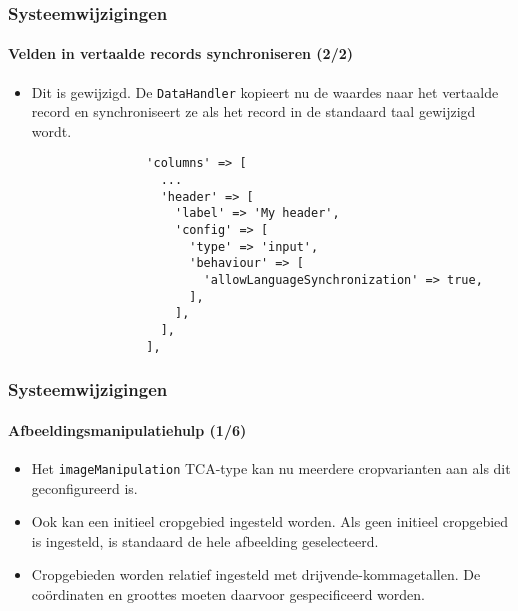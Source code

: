 
\begin{frame}[fragile]
	\frametitle{Systeemwijzigingen}
	\framesubtitle{Velden in vertaalde records synchroniseren (2/2)}

	\lstset{basicstyle=\tiny\ttfamily}

	\begin{itemize}
		\item Dit is gewijzigd. De \texttt{DataHandler} kopieert nu de waardes naar het vertaalde record
		 	en synchroniseert ze als het record in de standaard taal gewijzigd wordt.

			\begin{lstlisting}
				'columns' => [
				  ...
				  'header' => [
				    'label' => 'My header',
				    'config' => [
				      'type' => 'input',
				      'behaviour' => [
				        'allowLanguageSynchronization' => true,
				      ],
				    ],
				  ],
				],
			\end{lstlisting}

	\end{itemize}

\end{frame}


\begin{frame}[fragile]
	\frametitle{Systeemwijzigingen}
	\framesubtitle{Afbeeldingsmanipulatiehulp (1/6)}

	\lstset{basicstyle=\tiny\ttfamily}

	\begin{itemize}
		\item Het \texttt{imageManipulation} TCA-type kan nu meerdere cropvarianten aan als dit geconfigureerd is.

		\item Ook kan een initieel cropgebied ingesteld worden. Als geen initieel cropgebied is ingesteld,
		 	is standaard de hele afbeelding geselecteerd.
		\item Cropgebieden worden relatief ingesteld met drijvende-kommagetallen. De coördinaten en
		 	groottes moeten daarvoor gespecificeerd worden.

	\end{itemize}

\end{frame}

